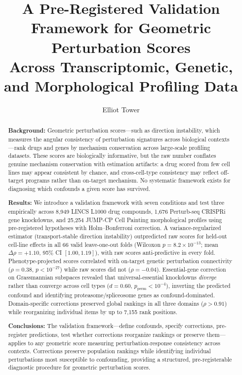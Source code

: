 \documentclass[11pt]{article}
\title{A Pre-Registered Validation Framework for Geometric Perturbation Scores\\Across Transcriptomic, Genetic, and Morphological Profiling Data}
\author{Elliot Tower}
\affil{Independent researcher \\ \texttt{elliot@elliottower.ai}}
\date{}
\begin{document}
\maketitle

\begin{abstract}
\textbf{Background:}
Geometric perturbation scores---such as direction instability, which
measures the angular consistency of perturbation signatures across
biological contexts---rank drugs and genes by mechanism conservation
across large-scale profiling datasets. These scores are biologically
informative, but the raw number conflates genuine mechanism conservation
with estimation artifacts: a drug scored from few cell lines may appear
consistent by chance, and cross-cell-type consistency may reflect
off-target programs rather than on-target mechanism. No systematic
framework exists for diagnosing which confounds a given score has survived.

\textbf{Results:}
We introduce a validation framework with seven conditions and test three
empirically across 8{,}949 LINCS L1000 drug compounds, 1{,}676
Perturb-seq CRISPRi gene knockdowns, and 25{,}254 JUMP-CP Cell Painting
morphological profiles using pre-registered hypotheses with
Holm--Bonferroni correction. A variance-regularized estimator
(transport-stable direction instability) outpredicted raw scores for
held-out cell-line effects in all 66 valid leave-one-out folds
(Wilcoxon $p = 8.2 \times 10^{-13}$; mean $\Delta\rho = +1.10$, 95\%
CI $[1.00, 1.19]$), with raw scores anti-predictive in every fold.
Phenotype-projected scores correlated with on-target genetic perturbation
connectivity ($\rho = 0.38$, $p < 10^{-27}$) while raw scores did not
($\rho = -0.04$). Essential-gene correction on Grassmannian subspaces
revealed that universal-essential knockdowns \emph{diverge} rather than
converge across cell types ($d = 0.60$, $p_{\text{perm}} < 10^{-4}$),
inverting the predicted confound and identifying proteasome/spliceosome
genes as confound-dominated. Domain-specific corrections preserved global
rankings in all three domains ($\rho > 0.91$) while reorganizing
individual items by up to 7{,}155 rank positions.

\textbf{Conclusions:}
The validation framework---define confounds, specify corrections,
pre-register predictions, test whether corrections reorganize rankings
or preserve them---applies to any geometric score measuring
perturbation-response consistency across contexts. Corrections preserve
population rankings while identifying individual perturbations most
susceptible to confounding, providing a structured, pre-registerable
diagnostic procedure for geometric perturbation scores.
\end{abstract}
\end{document}

